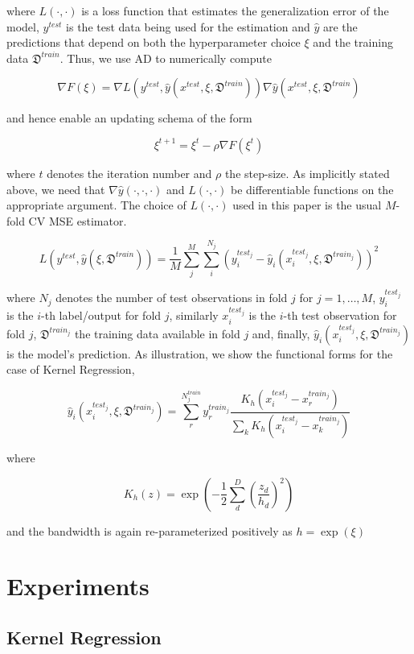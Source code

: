 \documentclass{article}
\begin{document}
where $L(\cdot, \cdot)$ is a loss function that estimates the generalization error of the
model, $y^{test}$ is the test data being used for the estimation and $\hat{y}$ are the
predictions that depend on both the hyperparameter choice $\xi$ and the training data
$\mathfrak{D}^{train}$. Thus, we use AD to numerically compute

$$\nabla F(\xi) = \nabla L(y^{test}, \hat{y}(x^{test}, \xi, \mathfrak{D}^{train})) \nabla
\hat{y}(x^{test}, \xi, \mathfrak{D}^{train})$$

and hence enable an updating schema of the form

$$\xi^{t+1} = \xi^{t} - \rho \nabla F(\xi^{t})$$

where $t$ denotes the iteration number and $\rho$ the step-size. As implicitly stated above,
we need that $\nabla \hat{y}(\cdot, \cdot,\cdot)$ and $L(\cdot, \cdot)$ be differentiable
functions on the appropriate argument. The choice of $L(\cdot, \cdot)$ used in this paper is
the usual $M$-fold CV MSE estimator.

$$L(y^{test}, \hat{y}(\xi,\mathfrak{D}^{train})) =
\frac{1}{M}\sum_j^{M}\sum_i^{N_j}(y_i^{test_j} -
\hat{y}_i(x_i^{test_j}, \xi, \mathfrak{D}^{train_j}))^2$$

where $N_j$ denotes the number of test observations in fold $j$ for $j=1, \dots, M$,
$y_i^{test_j}$ is the $i$-th label/output for fold $j$, similarly $x_i^{test_j}$ is the
$i$-th test observation for fold $j$, $\mathfrak{D}^{train_j}$ the training data available
in fold $j$ and, finally, $\hat{y}_i(x_i^{test_j}, \xi, \mathfrak{D}^{train_j})$ is the
model's prediction. As illustration, we show the functional forms for the case of
Kernel Regression,

$$ \hat{y}_i(x_i^{test_j}, \xi, \mathfrak{D}^{train_j}) =
\sum_{r}^{N_j^{train}}
y_{r}^{train_j} \frac{K_h(x_i^{test_j} - x_{r}^{train_j})} {
\sum_k K_h(x_i^{test_j} - x_{k}^{train_j})} $$

where

$$
K_{h}(z) = \exp \left( - \frac{1}{2} \sum_d^{D} \left( \frac{z_d}{h_d} \right)^{2} \right)
$$

and the bandwidth is again re-parameterized positively as $h = \exp(\xi)$

\section{Experiments}

\subsection{Kernel Regression}
\end{document}
